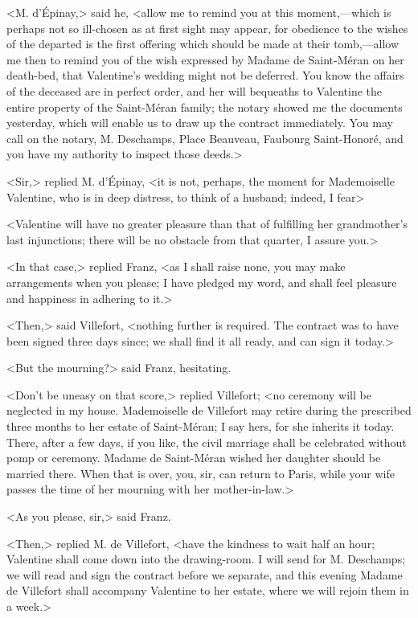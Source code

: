  <M. d'Épinay,> said he, <allow me to remind you at this moment,—which is perhaps not so ill-chosen as at first sight may appear, for obedience to the wishes of the departed is the first offering which should be made at their tomb,—allow me then to remind you of the wish expressed by Madame de Saint-Méran on her death-bed, that Valentine's wedding might not be deferred. You know the affairs of the deceased are in perfect order, and her will bequeaths to Valentine the entire property of the Saint-Méran family; the notary showed me the documents yesterday, which will enable us to draw up the contract immediately. You may call on the notary, M. Deschamps, Place Beauveau, Faubourg Saint-Honoré, and you have my authority to inspect those deeds.> 

 <Sir,> replied M. d'Épinay, <it is not, perhaps, the moment for Mademoiselle Valentine, who is in deep distress, to think of a husband; indeed, I fear\longdash>

<Valentine will have no greater pleasure than that of fulfilling her grandmother's last injunctions; there will be no obstacle from that quarter, I assure you.> 

 <In that case,> replied Franz, <as I shall raise none, you may make arrangements when you please; I have pledged my word, and shall feel pleasure and happiness in adhering to it.> 

 <Then,> said Villefort, <nothing further is required. The contract was to have been signed three days since; we shall find it all ready, and can sign it today.> 

 <But the mourning?> said Franz, hesitating. 

 <Don't be uneasy on that score,> replied Villefort; <no ceremony will be neglected in my house. Mademoiselle de Villefort may retire during the prescribed three months to her estate of Saint-Méran; I say hers, for she inherits it today. There, after a few days, if you like, the civil marriage shall be celebrated without pomp or ceremony. Madame de Saint-Méran wished her daughter should be married there. When that is over, you, sir, can return to Paris, while your wife passes the time of her mourning with her mother-in-law.> 

 <As you please, sir,> said Franz. 

 <Then,> replied M. de Villefort, <have the kindness to wait half an hour; Valentine shall come down into the drawing-room. I will send for M. Deschamps; we will read and sign the contract before we separate, and this evening Madame de Villefort shall accompany Valentine to her estate, where we will rejoin them in a week.> 

